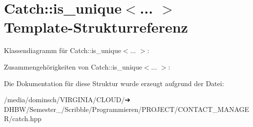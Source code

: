 \hypertarget{structCatch_1_1is__unique}{}\section{Catch\+:\+:is\+\_\+unique$<$... $>$ Template-\/\+Strukturreferenz}
\label{structCatch_1_1is__unique}


Klassendiagramm für Catch\+:\+:is\+\_\+unique$<$... $>$\+:


Zusammengehörigkeiten von Catch\+:\+:is\+\_\+unique$<$... $>$\+:


Die Dokumentation für diese Struktur wurde erzeugt aufgrund der Datei\+:\begin{DoxyCompactItemize}
\item 
/media/dominsch/\+V\+I\+R\+G\+I\+N\+I\+A/\+C\+L\+O\+U\+D/➔ D\+H\+B\+W/\+Semester\+\_/\+Scribble/\+Programmieren/\+P\+R\+O\+J\+E\+C\+T/\+C\+O\+N\+T\+A\+C\+T\+\_\+\+M\+A\+N\+A\+G\+E\+R/catch.\+hpp\end{DoxyCompactItemize}
